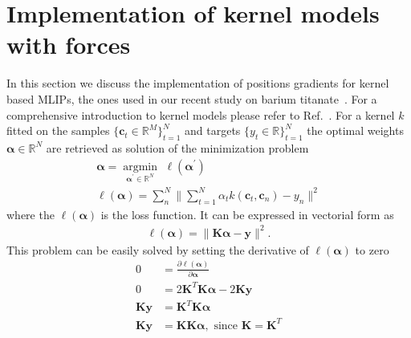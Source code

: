\section{Implementation of kernel models with forces}
In this section we discuss the implementation of positions gradients for kernel based MLIPs, the ones used in our recent study on barium titanate~\cite{gigli2023modeling}.
For a comprehensive introduction to kernel models please refer to Ref.~\cite{bishop2006pattern}. For a kernel $k$ fitted on the samples $\{\mathbf{c}_t\in\mathbb{R}^M\}_{t=1}^N$ and targets $\{y_t\in\mathbb{R}\}_{t=1}^N$ the optimal weights $\boldsymbol{\alpha}\in\mathbb{R}^N$ are retrieved as solution of the minimization problem
\begin{subequations}
  \label{eq:minkernel}
  \begin{gather}
    \boldsymbol{\alpha} = \underset{\boldsymbol{\alpha}^\prime\in\mathbb{R}^N}{{\operatorname{argmin}}}\,\, \ell(\boldsymbol{\alpha}^\prime)\\
    \ell(\boldsymbol{\alpha}) = \sum_{n}^N\| \sum_{t=1}^N \alpha_t k(\mathbf{c}_t, \mathbf{c}_{n}) - y_{n}\|^2
  \end{gather}
\end{subequations}
where the $\ell(\boldsymbol{\alpha})$ is the loss function.
It can be expressed in vectorial form as
\begin{subequations}
  \label{eq:minkernel}
  \begin{align}
    \ell(\boldsymbol{\alpha}) = \|\mathbf{K}\boldsymbol{\alpha} - \mathbf{y}\|^2.
  \end{align}
\end{subequations}
This problem can be easily solved by setting the derivative of $\ell(\boldsymbol{\alpha})$ to zero
\begin{subequations}
  \label{eq:solving_kernel}
  \begin{align}
    0 &= \frac{\partial \ell(\boldsymbol{\alpha})}{\partial\boldsymbol{\alpha}}\\
    0 &= 2\mathbf{K}^T\mathbf{K}\boldsymbol{\alpha} - 2\mathbf{K}\mathbf{y}\\
    \mathbf{K}\mathbf{y} &= \mathbf{K}^T\mathbf{K}\boldsymbol{\alpha}\\
    \mathbf{K}\mathbf{y} &= \mathbf{K}\mathbf{K}\boldsymbol{\alpha},\textrm{ since $\mathbf{K} = \mathbf{K}^T$} \label{eq:kernel_symmetry}
  \end{align}
\end{subequations}
